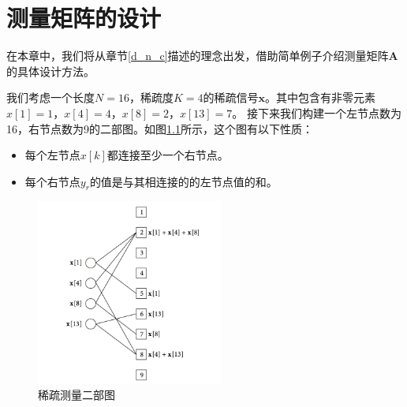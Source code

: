 \documentclass[AutoFakeBold]{LZUThesis}
\begin{document}
\chapter{测量矩阵的设计}

在本章中，我们将从章节\ref{d_n_c}描述的理念出发，借助简单例子介绍测量矩阵$\mathbf{A}$的具体设计方法。

我们考虑一个长度$N=16$，稀疏度$K=4$的稀疏信号$\mathbf{x}$。其中包含有非零元素$x[1] = 1$，$x[4] = 4$，$x[8] = 2$，$x[13] = 7$。
接下来我们构建一个左节点数为16，右节点数为9的二部图。如图\ref{fig_bip_graph}所示，这个图有以下性质：

\begin{itemize}
    \item 每个左节点$x[k]$都连接至少一个右节点。
    \item 每个右节点$y_r$的值是与其相连接的的左节点值的和。
\end{itemize}

\begin{figure}[H]
    \centering
    \includegraphics[width=0.55\textwidth]{figures/bip_g.png}
    \caption{稀疏测量二部图}
    \label{fig_bip_graph}
\end{figure}
\end{document}
